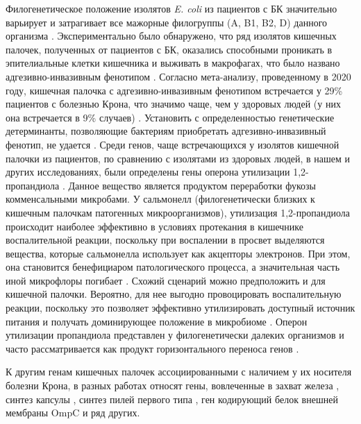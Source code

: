Филогенетическое положение изолятов \textit{E. coli} из пациентов с БК значительно варьирует и затрагивает все мажорные филогруппы (A, B1, B2, D) данного организма \cite{rakitina2017genome}. Экспериментально было обнаружено, что ряд изолятов кишечных палочек, полученных от пациентов с БК, оказались способными проникать в эпителиальные клетки кишечника и выживать в макрофагах, что было названо адгезивно-инвазивным фенотипом \cite{boudeau1999invasive, martinez2009molecular,  miquel2010complete}. Согласно мета-анализу, проведенному в 2020 году, кишечная палочка с адгезивно-инвазивным фенотипом встречается у 29\% пациентов с болезнью Крона, что значимо чаще, чем у здоровых людей (у них она встречается в 9\% случаев) \cite{nadalian2020prevalence}. Установить с определенностью генетические детерминанты, позволяющие бактериям приобретать адгезивно-инвазивный фенотип, не удается \cite{shaler2019unique, camprubi2018comparative}. Среди генов, чаще встречающихся у изолятов кишечной палочки из пациентов, по сравнению с изолятами из здоровых людей, в нашем и других исследованиях, были определены гены оперона утилизации 1,2-пропандиола \cite{rakitina2017genome, viladomiu2021adherent, dogan2014inflammation}. Данное вещество является продуктом переработки фукозы комменсальными микробами. У сальмонелл (филогенетически близких к кишечным палочкам патогенных микроорганизмов), утилизация 1,2-пропандиола происходит наиболее эффективно в условиях протекания в кишечнике воспалительной реакции, поскольку при воспалении в просвет выделяются вещества, которые сальмонелла использует как акцепторы электронов. При этом, она становится бенефициаром патологического процесса, а значительная часть иной микрофлоры погибает \cite{faber2017respiration}. Схожий сценарий можно предположить и для кишечной палочки. Вероятно, для нее выгодно провоцировать воспалительную реакции, поскольку это позволяет эффективно утилизировать доступный источник питания и получать доминирующее положение в микробиоме \cite{rakitina2017genome}. Оперон утилизации пропандиола представлен у филогенетически далеких организмов и часто рассматривается как продукт горизонтального переноса генов \cite{anast2020cobalamin, bobik1997propanediol}.

К другим генам кишечных палочек ассоциированными с наличием у их носителя болезни Крона, в разных работах относят гены, вовлеченные в захват железа \cite{rakitina2017genome, nash2010genome}, синтез капсулы \cite{rakitina2017genome, conte2014adherent}, синтез пилей первого типа \cite{cespedes2017genetic}, ген кодирующий белок внешней мембраны OmpC \cite{rolhion2007ompc} и ряд других.


